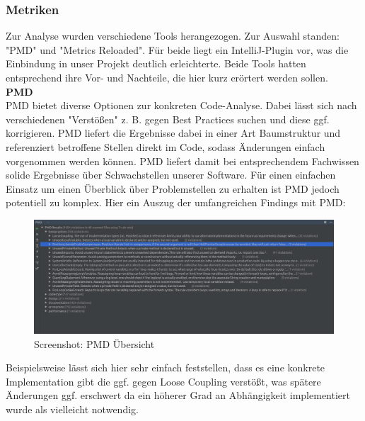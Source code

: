 \subsubsection{Metriken}
Zur Analyse wurden verschiedene Tools herangezogen. Zur Auswahl standen: "PMD" und "Metrics Reloaded". Für beide liegt ein IntelliJ-Plugin vor, was die Einbindung in unser Projekt deutlich erleichterte. Beide Tools hatten entsprechend ihre Vor- und Nachteile, die hier kurz erörtert werden sollen.\\
\textbf{PMD} \cite{PMD} \\
PMD bietet diverse Optionen zur konkreten Code-Analyse. Dabei lässt sich nach verschiedenen "Verstößen" z. B. gegen Best Practices suchen und diese ggf. korrigieren. PMD liefert die Ergebnisse dabei in einer Art Baumstruktur und referenziert betroffene Stellen direkt im Code, sodass Änderungen einfach vorgenommen werden können. PMD liefert damit bei entsprechendem Fachwissen solide Ergebnisse über Schwachstellen unserer Software. Für einen einfachen Einsatz um einen Überblick über Problemstellen zu erhalten ist PMD jedoch potentiell zu komplex. 
Hier ein Auszug der umfangreichen Findings mit PMD:

\begin{figure}
\includegraphics[width=1\textwidth]{../img/sq/pmd1.PNG}
\caption{Screenshot: PMD Übersicht}
\label{fig:Screenshot PMD Übersicht}
\end{figure}
Beispielsweise lässt sich hier sehr einfach feststellen, dass es eine konkrete Implementation gibt die ggf. gegen Loose Coupling verstößt, was spätere Änderungen ggf. erschwert da ein höherer Grad an Abhängigkeit implementiert wurde als vielleicht notwendig. 


